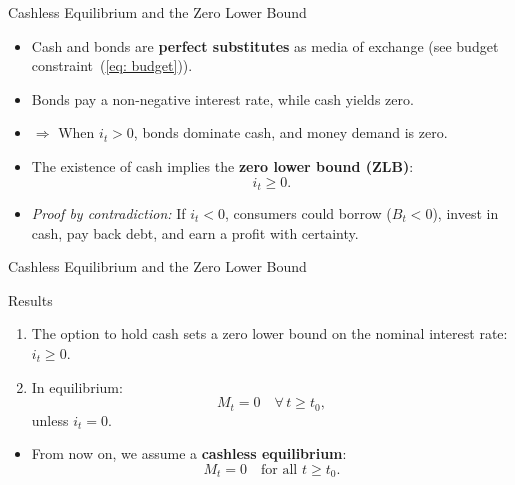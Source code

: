 \documentclass[11pt,aspectratio=169]{beamer}
\begin{document}
\begin{frame}{Cashless Equilibrium and the Zero Lower Bound}
\begin{itemize}
  \item Cash and bonds are \textbf{perfect substitutes} as media of exchange 
  (see budget constraint~(\ref{eq: budget})).
  \item Bonds pay a non-negative interest rate, while cash yields zero.
  \item $\Rightarrow$ When $i_t>0$, bonds dominate cash, and money demand is zero.
  \item The existence of cash implies the \textbf{zero lower bound (ZLB)}:
  \[
  i_t \ge 0.
  \]
  \item \textit{Proof by contradiction:}  
  If $i_t<0$, consumers could borrow ($B_t<0$), invest in cash, pay back debt, and earn a profit with certainty.
\end{itemize}
\end{frame}

\begin{frame}{Cashless Equilibrium and the Zero Lower Bound}
\begin{block}{Results}
\begin{enumerate}
  \item The option to hold cash sets a zero lower bound on the nominal interest rate: $i_t \geq 0$.
  \item In equilibrium:
  \[
  M_t = 0 \quad \forall\, t \ge t_0,
  \]
  unless $i_t = 0$.
\end{enumerate}
\end{block}

\begin{itemize}
  \item From now on, we assume a \textbf{cashless equilibrium}:
  \[
  M_t = 0 \quad \text{for all } t \ge t_0.
  \]
\end{itemize}
\end{frame}
\end{document}
